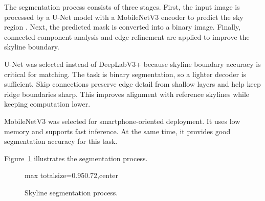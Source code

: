 The segmentation process consists of three stages. First, the input image is processed by a U-Net model with a MobileNetV3 encoder to predict the sky region \cite{ronneberger2015unet,howard2019mobilenetv3}. Next, the predicted mask is converted into a binary image. Finally, connected component analysis and edge refinement are applied to improve the skyline boundary.

U-Net was selected instead of DeepLabV3+ because skyline boundary accuracy is critical for matching. The task is binary segmentation, so a lighter decoder is sufficient. Skip connections preserve edge detail from shallow layers and help keep ridge boundaries sharp. This improves alignment with reference skylines while keeping computation lower.

MobileNetV3 was selected for smartphone-oriented deployment. It uses low memory and supports fast inference. At the same time, it provides good segmentation accuracy for this task.

Figure~\ref{fig:segmentation_pipeline} illustrates the segmentation process.

\begin{figure}[H]
\centering
\begin{adjustbox}{max totalsize={0.95\textwidth}{0.72\textheight},center}
\end{adjustbox}
\caption{Skyline segmentation process.}
\label{fig:segmentation_pipeline}
\end{figure}


